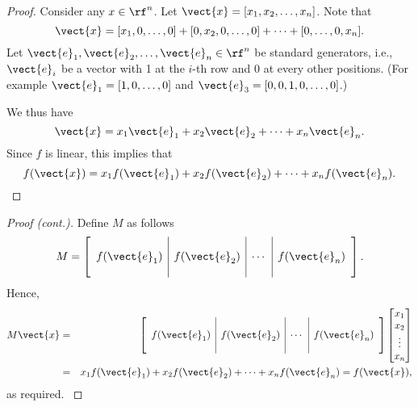 \begin{frame}

    \begin{proof}
      Consider any $x\in\rf^n$.
      Let $\vect{x}=[x_1,x_2,\ldots,x_n]$.  Note that
      \[
      \vect{x}=[x_1,0,\ldots,0] + [0,x_2,0,\ldots,0] + \cdots + [0,\ldots,0,x_n].
      \]
      Let $\vect{e}_1,\vect{e}_2,\ldots,\vect{e}_n\in\rf^n$ be standard
      generators, i.e., $\vect{e}_i$ be a vector with 1 at the $i$-th row
      and 0 at every other positions.  (For example
      $\vect{e}_1=[1,0,\ldots,0]$ and $\vect{e}_3=[0,0,1,0,\ldots,0]$.)

      We thus have
      \[
      \vect{x}=x_1\vect{e}_1 + x_2\vect{e}_2 + \cdots + x_n\vect{e}_n.
      \]
      Since $f$ is linear, this implies that
      \[
      f(\vect{x}) = x_1f(\vect{e}_1) + x_2f(\vect{e}_2) + \cdots + x_nf(\vect{e}_n).
      \]
    \end{proof}
\end{frame}

\begin{frame}
  \begin{proof}[Proof (cont.)]
    {\small
      Define $M$ as follows
      \[
      M=\left[
        \begin{array}{c|c|c|c}
          & & &  \\
          f(\vect{e}_1) &
          f(\vect{e}_2) &
          \cdots &
          f(\vect{e}_n) \\
          & & & 
        \end{array}
        \right].
      \]
      Hence,
      \begin{eqnarray*}
        M\vect{x} &=& \left[
          \begin{array}{c|c|c|c}
            & & &  \\
            f(\vect{e}_1) &
            f(\vect{e}_2) &
            \cdots &
            f(\vect{e}_n) \\
            & & & 
          \end{array}
          \right]
        \begin{bmatrix}
          x_1 \\
          x_2 \\
          \vdots \\
          x_n
        \end{bmatrix} \\
        &=&
        x_1f(\vect{e}_1) + x_2f(\vect{e}_2) + \cdots + x_nf(\vect{e}_n)
        = f(\vect{x}),
      \end{eqnarray*}
      as required.
    }
  \end{proof}
\end{frame}

